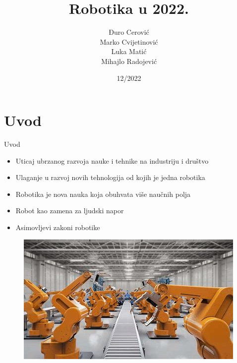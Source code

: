 \documentclass{beamer}
\title{Robotika u 2022.}
\subtitle{}
\institute[Tehničko i naučno pisanje]{Matematički fakultet\\Univerziteta u Beogradu}
\author[]{Đuro Cerović\\Marko Cvijetinović\\Luka Matić\\Mihajlo Radojević}
\date{12/2022}
\begin{document}
\begin{frame}
\titlepage
\end{frame}


\section{Uvod}
%
\begin{frame}{Uvod}
    \begin{itemize}
        \item Uticaj ubrzanog razvoja nauke i tehnike na industriju i društvo
        \item Ulaganje u razvoj novih tehnologija  od kojih je jedna robotika
        \item Robotika je nova nauka koja obuhvata više naučnih polja
        \item Robot kao zamena za ljudski napor
        \item Asimovljevi zakoni robotike
    \end{itemize}
    \begin{figure}
        \centering
        \includegraphics[scale=0.45]{roboti.png}   
    \end{figure}
\end{frame}
 
\end{document}
